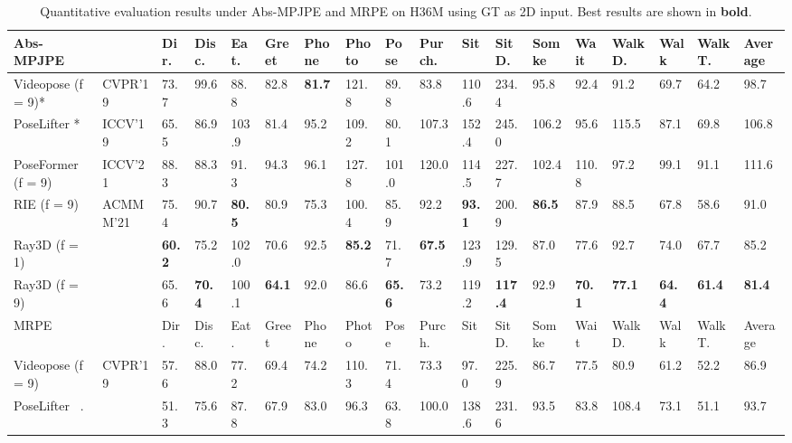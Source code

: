 \documentclass[10pt,twocolumn,letterpaper]{article}
\begin{document}
\iffalse
\begin{table*}[htbp]
\centering
\tiny
\caption{Quantitative evaluation results under Abs-MPJPE and MRPE on H36M using GT as 2D input. Best results are shown in \textbf{bold}.}
\begin{tabular}{@{}l|llllllllllllllll|l@{}}
\toprule
Abs-MPJPE              &                                   &Dir.  &Disc. &Eat.  &Greet  &Phone & Photo & Pose & Purch.   &Sit     &SitD.  & Somke & Wait  & WalkD. & Walk & WalkT. & Average \\ \midrule
Videopose (f = 9)* ~\cite{dario2019videopose} &CVPR'19 &73.7  &99.6  &88.8  &82.8   &\textbf{81.7}  & 121.8 & 89.8 & 83.8     & 110.6  & 234.4 & 95.8  & 92.4  & 91.2   & 69.7 & 64.2   & 98.7    \\ 
PoseLifter *~\cite{ju2019absposelifter}           &ICCV'19 &65.5  &86.9  &103.9 &81.4   &95.2  & 109.2 & 80.1 & 107.3    & 152.4  & 245.0 & 106.2 & 95.6  & 115.5  & 87.1 & 69.8   & 106.8   \\
PoseFormer (f = 9) \cite{ce2021poseformer}        &ICCV'21 &88.3  &88.3  &91.3  &94.3   &96.1  & 127.8 & 101.0& 120.0    & 114.5  & 227.7 & 102.4 & 110.8 & 97.2   & 99.1 & 91.1   & 111.6   \\
RIE (f = 9) ~\cite{wenkang2021improving}          &ACMMM'21&75.4  &90.7  &\textbf{80.5}  &80.9   &75.3  & 100.4 & 85.9 & 92.2     & \textbf{93.1}   & 200.9 & \textbf{86.5}  & 87.9  & 88.5   & 67.8 & 58.6   & 91.0    \\ \hline
Ray3D (f = 1)                                     &        &\textbf{60.2}  &75.2  &102.0 &70.6   &92.5  & \textbf{85.2}  & 71.7 & \textbf{67.5}     & 123.9  & 129.5 & 87.0  & 77.6  & 92.7   & 74.0 & 67.7   & 85.2    \\ 
Ray3D (f = 9)                                     &        &65.6  &\textbf{70.4}  &100.1 &\textbf{64.1}   &92.0  & 86.6  & \textbf{65.6} & 73.2     & 119.2  & \textbf{117.4} & 92.9  & \textbf{70.1}  & \textbf{77.1}   & \textbf{64.4} & \textbf{61.4}   & \textbf{81.4}    \\ \bottomrule
MRPE                    &                                  &Dir.  &Disc. &Eat.  &Greet  &Phone &Photo  & Pose & Purch.   &Sit     &SitD.  & Somke & Wait  & WalkD. & Walk & WalkT. & Average \\ \midrule
Videopose (f = 9) ~\cite{dario2019videopose} &CVPR'19  &57.6  &88.0  &77.2  &69.4   &74.2  &110.3  & 71.4 & 73.3     & 97.0   & 225.9 & 86.7  & 77.5  & 80.9   & 61.2 & 52.2   & 86.9    \\ 
PoseLifter ~\cite{ju2019absposelifter}.          &         &51.3  &75.6  &87.8  &67.9   &83.0  & 96.3  & 63.8 & 100.0    & 138.6  & 231.6 & 93.5  & 83.8  & 108.4  & 73.1 & 51.1   & 93.7    \\

\end{tabular}
\end{table*}
\end{document}
